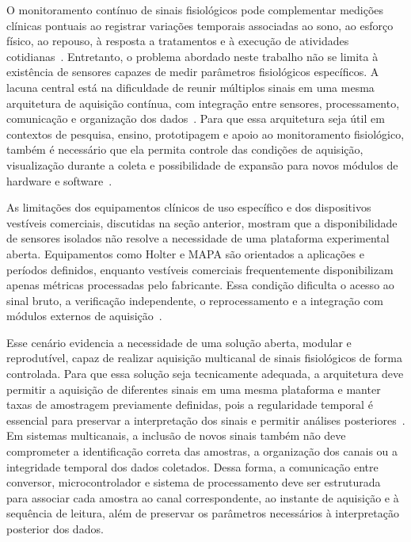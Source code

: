 \documentclass[a4paper,12pt]{fcte}
\begin{document}
O monitoramento contínuo de sinais fisiológicos pode complementar medições clínicas pontuais ao registrar variações temporais associadas ao sono, ao esforço físico, ao repouso, à resposta a tratamentos e à execução de atividades cotidianas~\cite{vaghasiya2023wearable_telehealth,tan2024remote_patient_monitoring}. Entretanto, o problema abordado neste trabalho não se limita à existência de sensores capazes de medir parâmetros fisiológicos específicos. A lacuna central está na dificuldade de reunir múltiplos sinais em uma mesma arquitetura de aquisição contínua, com integração entre sensores, processamento, comunicação e organização dos dados~\cite{ates2022wearable_sensors}. Para que essa arquitetura seja útil em contextos de pesquisa, ensino, prototipagem e apoio ao monitoramento fisiológico, também é necessário que ela permita controle das condições de aquisição, visualização durante a coleta e possibilidade de expansão para novos módulos de hardware e software~\cite{ates2022wearable_sensors,vaghasiya2023wearable_telehealth}.

As limitações dos equipamentos clínicos de uso específico e dos dispositivos vestíveis comerciais, discutidas na seção anterior, mostram que a disponibilidade de sensores isolados não resolve a necessidade de uma plataforma experimental aberta. Equipamentos como Holter e MAPA são orientados a aplicações e períodos definidos, enquanto vestíveis comerciais frequentemente disponibilizam apenas métricas processadas pelo fabricante. Essa condição dificulta o acesso ao sinal bruto, a verificação independente, o reprocessamento e a integração com módulos externos de aquisição~\cite{mayo2024holter,lee2024abpm,canali2022wearables_challenges,jamieson2025consumer_wearables}.

Esse cenário evidencia a necessidade de uma solução aberta, modular e reprodutível, capaz de realizar aquisição multicanal de sinais fisiológicos de forma controlada. Para que essa solução seja tecnicamente adequada, a arquitetura deve permitir a aquisição de diferentes sinais em uma mesma plataforma e manter taxas de amostragem previamente definidas, pois a regularidade temporal é essencial para preservar a interpretação dos sinais e permitir análises posteriores~\cite{devi2020realtimedaq,ates2022wearable_sensors}. Em sistemas multicanais, a inclusão de novos sinais também não deve comprometer a identificação correta das amostras, a organização dos canais ou a integridade temporal dos dados coletados. Dessa forma, a comunicação entre conversor, microcontrolador e sistema de processamento deve ser estruturada para associar cada amostra ao canal correspondente, ao instante de aquisição e à sequência de leitura, além de preservar os parâmetros necessários à interpretação posterior dos dados.
\end{document}
